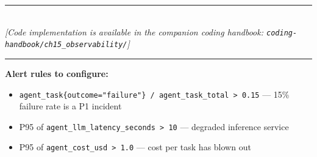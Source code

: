 \begin{center}
\noindent\rule{0.6\textwidth}{0.4pt} \\
\vspace{0.3em}
\textit{[Code implementation is available in the companion coding handbook: \texttt{coding-handbook/ch15\_observability/}]} \\
\noindent\rule{0.6\textwidth}{0.4pt}
\end{center}


\textbf{Alert rules to configure:} 
\begin{itemize}
    \item \texttt{agent\_task\{outcome="failure"\} / agent\_task\_total > 0.15} — 15\% failure rate is a P1 incident
    \item P95 of \texttt{agent\_llm\_latency\_seconds > 10} — degraded inference service
    \item P95 of \texttt{agent\_cost\_usd > 1.0} — cost per task has blown out
\end{itemize}
